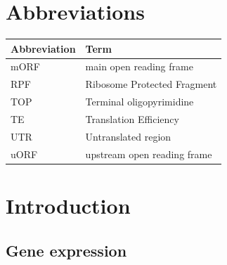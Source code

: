\documentclass[
  12pt,
  openany]{book}
\author{}
\date{\vspace{-2.5em}}
\begin{document}
{
\setcounter{tocdepth}{4}
\tableofcontents
}
\cleardoublepage
{}
\pagestyle{fancy}
\fancyhf{}
\renewcommand{\headrulewidth}{0pt}
\fancyfoot[LE,RO]{\thepage}
\renewcommand{\floatpagefraction}{.9}

\setcounter{page}{11}

\hypertarget{abbreviations}{%
\chapter*{Abbreviations}\label{abbreviations}}

\begin{tabular}{ll}
\toprule
Abbreviation & Term\\
\midrule
mORF & main open reading frame\\
RPF & Ribosome Protected Fragment\\
TOP & Terminal oligopyrimidine\\
TE & Translation Efficiency\\
UTR & Untranslated region\\
uORF & upstream open reading frame\\
\bottomrule
\end{tabular}
\clearpage
{}

\setcounter{page}{1}

\chapter{Introduction}
\section{Gene expression}
\end{document}
